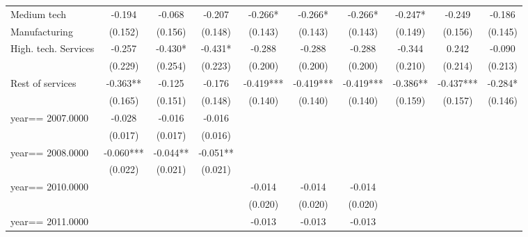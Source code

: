 \begin{table}[htbp]
\begin{tabular}{l*{9}{c}}
Medium tech         &      -0.194   &      -0.068   &      -0.207   &      -0.266*  &      -0.266*  &      -0.266*  &      -0.247*  &      -0.249   &      -0.186   \\
Manufacturing       &     (0.152)   &     (0.156)   &     (0.148)   &     (0.143)   &     (0.143)   &     (0.143)   &     (0.149)   &     (0.156)   &     (0.145)   \\
High. tech. Services&      -0.257   &      -0.430*  &      -0.431*  &      -0.288   &      -0.288   &      -0.288   &      -0.344   &       0.242   &      -0.090   \\
                    &     (0.229)   &     (0.254)   &     (0.223)   &     (0.200)   &     (0.200)   &     (0.200)   &     (0.210)   &     (0.214)   &     (0.213)   \\
Rest of services    &      -0.363** &      -0.125   &      -0.176   &      -0.419***&      -0.419***&      -0.419***&      -0.386** &      -0.437***&      -0.284*  \\
                    &     (0.165)   &     (0.151)   &     (0.148)   &     (0.140)   &     (0.140)   &     (0.140)   &     (0.159)   &     (0.157)   &     (0.146)   \\
year==  2007.0000   &      -0.028   &      -0.016   &      -0.016   &               &               &               &               &               &               \\
                    &     (0.017)   &     (0.017)   &     (0.016)   &               &               &               &               &               &               \\
year==  2008.0000   &      -0.060***&      -0.044** &      -0.051** &               &               &               &               &               &               \\
                    &     (0.022)   &     (0.021)   &     (0.021)   &               &               &               &               &               &               \\
year==  2010.0000   &               &               &               &      -0.014   &      -0.014   &      -0.014   &               &               &               \\
                    &               &               &               &     (0.020)   &     (0.020)   &     (0.020)   &               &               &               \\
year==  2011.0000   &               &               &               &      -0.013   &      -0.013   &      -0.013   &               &               &               \\

\end{tabular}
\end{table}

